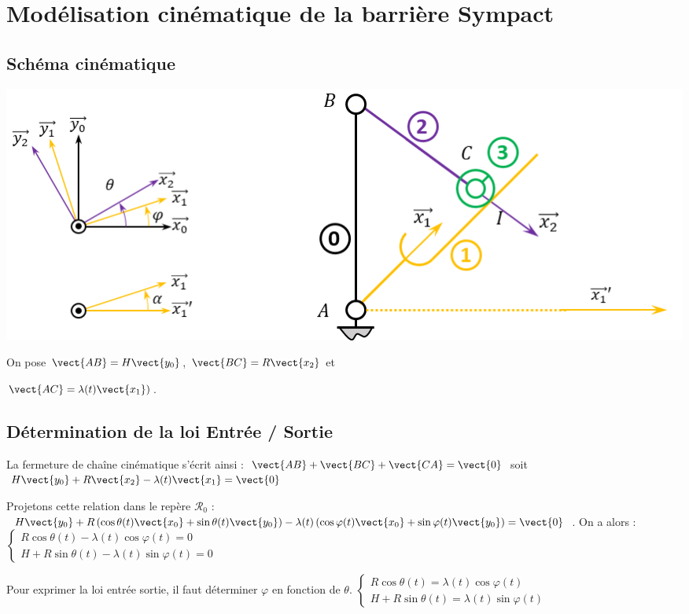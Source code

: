 

\section{Modélisation cinématique de la barrière Sympact}
\subsection{Schéma cinématique}


\begin{center}
 \includegraphics[width=.95\textwidth]{images/fig_01}
\end{center}

On pose $\vect{AB}=H\vect{y_0}$, $\vect{BC}=R\vect{x_2}$ et

$\vect{AC}=\lambda(t)\vect{x_1})$.
\subsection{Détermination de la loi Entrée / Sortie}

La fermeture de chaîne cinématique s'écrit ainsi : $\vect{AB}+\vect{BC}+\vect{CA}=\vect{0}$ soit $H\vect{y_0}+R\vect{x_2}-\lambda(t)\vect{x_1}=\vect{0}$

Projetons cette relation dans le repère $\mathcal{R}_{0}$ :
$H\vect{y_0}+R\left(\cos\theta(t) \vect{x_0}+\sin\theta(t) \vect{y_0}\right) 
-\lambda(t)\left(\cos\varphi(t) \vect{x_0}+\sin\varphi(t) \vect{y_0}\right) 
=\vect{0}$. On a alors :
$\left\{
\begin{array}{l}
R\cos\theta(t) -\lambda(t) \cos\varphi(t) =0 \\
H+R\sin\theta(t) -\lambda(t)\sin\varphi(t) =0
\end{array} 
\right.$


Pour exprimer la loi entrée sortie, il faut déterminer $\varphi$ en fonction de $\theta$.
$\left\{
\begin{array}{l}
R\cos\theta(t) = \lambda(t) \cos\varphi(t)\\
H+R\sin\theta(t) =\lambda(t)\sin\varphi(t)
\end{array} 
\right.$


